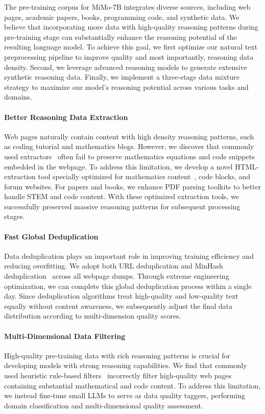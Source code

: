 \documentclass[11pt, a4paper, logo, copyright, nonumbering]{xiaomi}
\newcommand{\mimo}{MiMo-7B}
\begin{document}
The pre-training corpus for \mimo{} integrates diverse sources, including web pages, academic papers, books, programming code, and synthetic data. 
We believe that incorporating more data with high-quality reasoning patterns during pre-training stage can substantially enhance the reasoning potential of the resulting language model.
To achieve this goal, we first optimize our natural text preprocessing pipeline to improve quality and most importantly, reasoning data density.
Second, we leverage advanced reasoning models to generate extensive synthetic reasoning data.
Finally, we implement a three-stage data mixture strategy to maximize our model's reasoning potential across various tasks and domains.


\paragraph{Better Reasoning Data Extraction} 
Web pages naturally contain content with high density reasoning patterns, such as coding tutorial and mathematics blogs.
However, we discover that commonly used extractors~\citep{barbaresi-2021-trafilatura} often fail to preserve mathematics equations and code snippets embedded in the webpage.
To address this limitation, we develop a novel HTML-extraction tool specially optimized for mathematics content~\citep{liu2024finemath,paster2023openwebmath,zhou2025megamath}, code blocks, and forum websites.
For papers and books, we enhance PDF parsing toolkits to better handle STEM and code content.
With these optimized extraction tools, we successfully preserved massive reasoning patterns for subsequent processing stages.



\paragraph{Fast Global Deduplication}
Data deduplication plays an important role in improving training efficiency and reducing overfitting. 
We adopt both URL deduplication and MinHash deduplication~\citep{broder1997resemblance} across all webpage dumps.
Through extreme engineering optimization, we can complete this global deduplication process within a single day.
Since deduplication algorithms treat high-quality and low-quality text equally without content awareness, we subsequently adjust the final data distribution according to multi-dimension quality scores.



\paragraph{Multi-Dimensional Data Filtering}
High-quality pre-training data with rich reasoning patterns is crucial for developing models with strong reasoning capabilities.
We find that commonly used heuristic rule-based filters~\citep{penedo2023refinedweb,penedo2024fineweb} incorrectly filter high-quality web pages containing substantial mathematical and code content.
To address this limitation, we instead fine-tune small LLMs to serve as data quality taggers, performing domain classification and multi-dimensional quality assessment.
\end{document}
